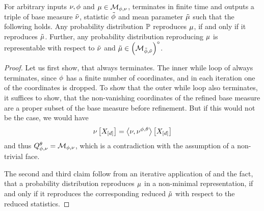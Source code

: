 \begin{theorem}
    \label{the:baseMeasureRefinement}
    For arbitrary inputs $\nu,\phi$ and $\mu\in\mathcal{M}_{\phi,\nu}$,  terminates in finite time and outputs a triple of base measure $\tilde{\nu}$, statistic $\tilde{\phi}$ and mean parameter $\tilde{\mu}$ such that the following holds.
    Any probability distribution $\mathbb{P}$ reproduces $\mu$, if and only if it reproduces $\tilde{\mu}$.
    Further, any probability distribution reproducing $\mu$ is representable with respect to $\tilde{\nu}$ and $\tilde{\mu}\in{\left(\mathcal{M}_{\tilde{\phi},\tilde{\nu}}\right)}^{\circ}$.
\end{theorem}
\begin{proof}
    Let us first show, that  always terminates.
    The inner while loop of  always terminates, since $\phi$ has a finite number of coordinates, and in each iteration one of the coordinates is dropped.
    To show that the outer while loop also terminates, it suffices to show, that the non-vanishing coordinates of the refined base measure are a proper subset of the base measure before refinement.
    But if this would not be the case, we would have
    \[ \nu\left[X_{[d]}\right] = \left\langle \nu,\nu^{\phi,\theta}\right\rangle \left[ X_{[d]} \right] \]
    and thus $Q^{\theta}_{\phi,\nu}=\mathcal{M}_{\phi,\nu}$, which is a contradiction with the assumption of a non-trivial face.

    The second and third claim follow from an iterative application of  and the fact, that a probability distribution reproduces $\mu$ in a non-minimal representation, if and only if it reproduces the corresponding reduced $\tilde{\mu}$ with respect to the reduced statistics.
\end{proof}


